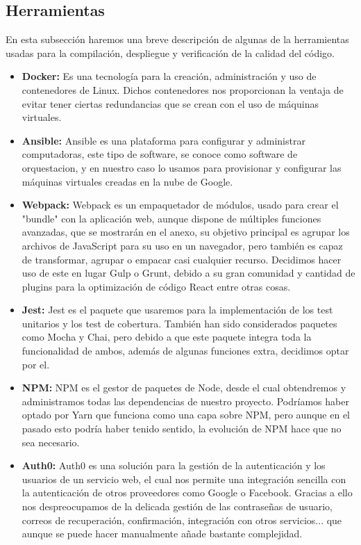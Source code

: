 \subsection {Herramientas}
En esta subsección haremos una breve descripción de algunas de la herramientas usadas para la compilación, despliegue y verificación de la calidad del código.

\begin{itemize}
  \item \textbf{Docker:} Es una tecnología para la creación, administración y uso de contenedores de Linux. Dichos contenedores nos proporcionan la ventaja de evitar tener ciertas redundancias que se crean con el uso de máquinas virtuales.
  
  \item \textbf{Ansible:} Ansible es una plataforma para configurar y administrar computadoras, este tipo de software, se conoce como software de \gls{orquestacion}, y en nuestro caso lo usamos para provisionar y configurar las máquinas virtuales creadas en la nube de Google.
  
  \item \textbf{Webpack:} Webpack es un empaquetador de módulos, usado para crear el "\gls{bundle}" con la aplicación web, aunque dispone de múltiples funciones avanzadas, que se mostrarán en el anexo, su objetivo principal es agrupar los archivos de JavaScript para su uso en un navegador, pero también es capaz de transformar, agrupar o empacar casi cualquier recurso. Decidimos hacer uso de este en lugar Gulp o Grunt, debido a su gran comunidad y cantidad de plugins para la optimización de código React entre otras cosas.

  \item \textbf{Jest:} Jest es el paquete que usaremos para la implementación de los test unitarios y los test de cobertura. También han sido considerados paquetes como Mocha y Chai, pero debido a que este paquete integra toda la funcionalidad de ambos, además de algunas funciones extra, decidimos optar por el.
  
  \item \textbf{NPM:} NPM es el gestor de paquetes de Node, desde el cual obtendremos y administramos todas las dependencias de nuestro proyecto. Podríamos haber optado por Yarn que funciona como una capa sobre NPM, pero aunque en el pasado esto podría haber tenido sentido, la evolución de NPM hace que no sea necesario.
  
  \item \textbf{Auth0:} Auth0 es una solución para la gestión de la autenticación y los usuarios de un servicio web, el cual nos permite una integración sencilla con la autenticación de otros proveedores como Google o Facebook.  Gracias a ello nos despreocupamos de la delicada gestión de las contraseñas de usuario, correos de recuperación, confirmación, integración con otros servicios... que aunque se puede hacer manualmente añade bastante complejidad.
  

\end{itemize}
